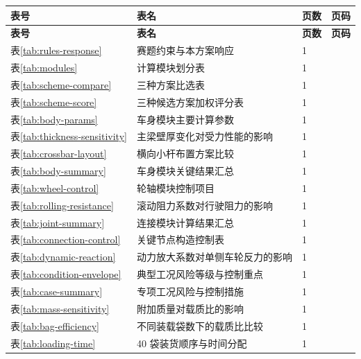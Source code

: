 \documentclass[UTF8,a4paper,12pt,fontset=none]{ctexart}
\numberwithin{equation}{section}
\numberwithin{figure}{section}
\numberwithin{table}{section}
\begin{document}
{
\begin{longtable}{@{}C{1.8cm}L{8.7cm}C{1.4cm}C{1.4cm}@{}}
\toprule
\textbf{表号} & \textbf{表名} & \textbf{页数} & \textbf{页码} \\
\midrule
\endfirsthead
\toprule
\textbf{表号} & \textbf{表名} & \textbf{页数} & \textbf{页码} \\
\midrule
\endhead
表\ref{tab:rules-response} & 赛题约束与本方案响应 & 1 & \pageref{tab:rules-response} \\
表\ref{tab:modules} & 计算模块划分表 & 1 & \pageref{tab:modules} \\
表\ref{tab:scheme-compare} & 三种方案比选表 & 1 & \pageref{tab:scheme-compare} \\
表\ref{tab:scheme-score} & 三种候选方案加权评分表 & 1 & \pageref{tab:scheme-score} \\
表\ref{tab:body-params} & 车身模块主要计算参数 & 1 & \pageref{tab:body-params} \\
表\ref{tab:thickness-sensitivity} & 主梁壁厚变化对受力性能的影响 & 1 & \pageref{tab:thickness-sensitivity} \\
表\ref{tab:crossbar-layout} & 横向小杆布置方案比较 & 1 & \pageref{tab:crossbar-layout} \\
表\ref{tab:body-summary} & 车身模块关键结果汇总 & 1 & \pageref{tab:body-summary} \\
表\ref{tab:wheel-control} & 轮轴模块控制项目 & 1 & \pageref{tab:wheel-control} \\
表\ref{tab:rolling-resistance} & 滚动阻力系数对行驶阻力的影响 & 1 & \pageref{tab:rolling-resistance} \\
表\ref{tab:joint-summary} & 连接模块计算结果汇总 & 1 & \pageref{tab:joint-summary} \\
表\ref{tab:connection-control} & 关键节点构造控制表 & 1 & \pageref{tab:connection-control} \\
表\ref{tab:dynamic-reaction} & 动力放大系数对单侧车轮反力的影响 & 1 & \pageref{tab:dynamic-reaction} \\
表\ref{tab:condition-envelope} & 典型工况风险等级与控制重点 & 1 & \pageref{tab:condition-envelope} \\
表\ref{tab:case-summary} & 专项工况风险与控制措施 & 1 & \pageref{tab:case-summary} \\
表\ref{tab:mass-sensitivity} & 附加质量对载质比的影响 & 1 & \pageref{tab:mass-sensitivity} \\
表\ref{tab:bag-efficiency} & 不同装载袋数下的载质比比较 & 1 & \pageref{tab:bag-efficiency} \\
表\ref{tab:loading-time} & 40 袋装货顺序与时间分配 & 1 & \pageref{tab:loading-time} \\

\end{longtable}}
\end{document}
